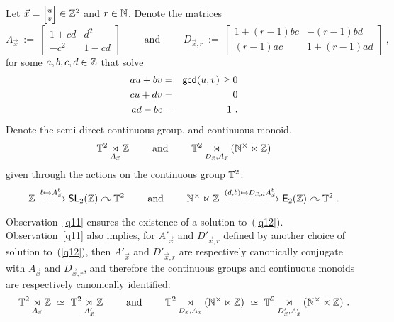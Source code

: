 \begin{notation}
\label{d6}
Let $\vec{x} = \mbox{\scriptsize$\begin{bmatrix} u \\ v \end{bmatrix}$} \in \ZZ^2$ and $r\in \mathbb N$.
Denote the matrices
\[
A_{\vec{x}} ~:=~
\begin{bmatrix}
1+cd
&
d^2
\\
-c^2
&
1-cd
\end{bmatrix}
\qquad
\text{ and }
\qquad
D_{\vec{x},r} ~:=~
\begin{bmatrix}
1 + (r-1) bc
& 
-(r-1)bd
\\
(r-1)ac
&
1+(r-1)ad
\end{bmatrix}
~,
\]
for some $a,b,c,d\in \mathbb Z$ that solve
\begin{eqnarray}
\label{q12}
au+bv
&
=
&
{\sf gcd}(u,v) \geq 0
\\
\nonumber
cu+dv
&
=
&
0
\\
\nonumber
ad-bc
&
=
&
1
~.
\end{eqnarray}
Denote the semi-direct continuous group, and continuous monoid, 
\[
\mathbb T^2 
\underset{A_{\vec{x}}}
\rtimes 
\mathbb Z
\qquad
\text{ and }
\qquad
\mathbb T^2 
\underset{D_{\vec{x}}, A_{\vec{x}}}
\rtimes 
(\mathbb N^\times \ltimes \mathbb Z)
\]
given through the actions on the continuous group $\mathbb T^2$:
\[
\mathbb Z 
\xrightarrow{b \mapsto {A_{\vec{x}}^b} }
\operatorname{\sf SL}_2(\mathbb Z)
\curvearrowright
\mathbb T^2
\qquad
\text{ and }
\qquad
\mathbb N^\times \ltimes \mathbb Z 
\xrightarrow{(d,b) \mapsto {D_{\vec{x},d}} {A_{\vec{x}}^b} }
\operatorname{\mathsf E_2(\mathbb Z)}
\curvearrowright 
\mathbb T^2
~.
\]


\end{notation}


\begin{remark}
\label{q13}
Observation~\ref{q11} ensures the existence of a solution to~(\ref{q12}).
Observation~\ref{q11} also implies, for $A'_{\vec{x}}$ and $D'_{\vec{x},r}$ defined by another choice of solution to~(\ref{q12}), then $A'_{\vec{x}}$ and $D'_{\vec{x},r}$ are respectively canonically conjugate with $A_{\vec{x}}$ and $D_{\vec{x},r}$, and therefore the continuous groups and continuous monoids are respectively canonically identified:
\[
\mathbb T^2 
\underset{A_{\vec{x}}}
\rtimes 
\mathbb Z
~\simeq~
\mathbb T^2 
\underset{A'_{\vec{x}}}
\rtimes 
\mathbb Z
\qquad
\text{ and }
\qquad
\mathbb T^2 
\underset{D_{\vec{x}}, A_{\vec{x}}}
\rtimes 
(\mathbb N^\times \ltimes \mathbb Z)
~\simeq~
\mathbb T^2 
\underset{D'_{\vec{x}}, A'_{\vec{x}}}
\rtimes 
(\mathbb N^\times \ltimes \mathbb Z)
~.
\]
\end{remark}







